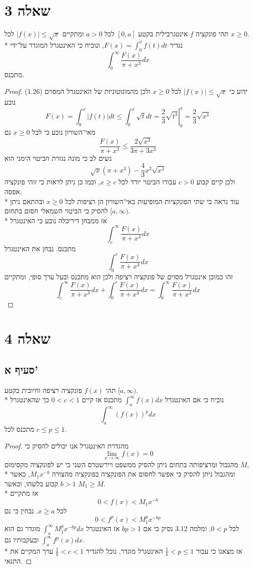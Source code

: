 \section{שאלה 3}
תהי פונקציה $f$ אינטגרבילית בקטע $[0, a]$ לכל $a > 0$ ומתקיים $\lvert f(x) \rvert \le \sqrt{x}$ לכל $x \ge 0$. \\*
נגדיר $F(x) = \int_0^x f(t) dt$, ונוכיח כי האינטגרל המוגדר על־ידי
\[
	\int_0^\infty \frac{F(x)}{\pi + x^3} dx \tag{1}
\]
מתכנס.
\begin{proof}
	ידוע כי $\lvert f(x) \rvert \le \sqrt{x}$ לכל $x \ge 0$ ולכן מהמונוטוניות של האינטגרל המסוים (1.26) נובע
	\[
		F(x) = \int_0^x \lvert f(t) \rvert dt \le \int_0^x \sqrt{t} dt = \left. \frac{2}{3} \sqrt{t^3} \right|_0^x = \frac{2}{3} \sqrt{x^3}
	\]
	מאי־השוויון נובע כי לכל $x \ge 0$ גם
	\[
		\frac{F(x)}{\pi + x^3} \le \frac{2 \sqrt{x^3}}{3 \pi + 3 x^3} \tag{2}
	\]
	נשים לב כי מונה נגזרת הביטוי הימני הוא
	\[
		\sqrt{x} (\pi + x^3) - \frac{4}{3} x^2 \sqrt{x^3}
	\]
	ולכן קיים קבוע $c > 0$ עבורו הביטוי יורד לכל $x \ge c$, וכמו כן ניתן לראות כי זוהי פונקציה אפסה. \\*
	עוד נראה כי שתי הפונקציות המופיעות באי־השוויון הן רציפות לכל $x \ge 0$ ובהתאם ניתן להסיק כי הביטוי השמאלי חסום בתחום $[a, \infty)$. \\* %
	אז ממבחן דיריכלה נובע כי האינטגרל
	\[
		\int_c^\infty \frac{F(x)}{\pi + x^3} dx
	\]
	מתכנס. נבחן את האינטגרל
	\[
		\int_0^c \frac{F(x)}{\pi + x^3} dx
	\]
	זהו כמובן אינטגרל מסוים של פונקציה רציפה ולכן הוא מתכנס ובעל ערך סופי, ומתקיים
	\[
		\int_c^\infty \frac{F(x)}{\pi + x^3} dx + \int_0^c \frac{F(x)}{\pi + x^3} dx
		= \int_0^\infty \frac{F(x)}{\pi + x^3} dx
	\]
\end{proof}

\section{שאלה 4}
\subsection{סעיף א'}
תהי $f(x)$ פונקציה רציפה וחיובית בקטע $[a, \infty)$. \\* %
נוכיח כי אם האינטגרל $\int_a^\infty f(x) dx$ מתכנס אז קיים $0 < c < 1$ כך שהאינטגרל
\[
	\int_a^\infty {(f(x))}^p dx
\]
מתכנס לכל $c \le p \le 1$.
\begin{proof}
	מהגדרת האינטגרל אנו יכולים להסיק כי
	\[
		\lim_{x \to \infty} f(x) = 0
	\]
	מהגבול ומרציפותה בתחום ניתן להסיק ממשפט ויירשטרס השני כי יש לפונקציה מקסימום $M$, \\*
	ומהגבול ניתן להסיק כי אפשר לחסום את הפונקציה בפונקציה מהצורה $M_1 x^{-b}$, כאשר $b > 1$ קבוע כלשהו, וכאשר $M_1 \ge M$. \\*
	אז מתקיים
	\[
		0 < f(x) < M_1 x^{-b}
	\]
	לכל $x \ge a$. נבחין כי גם
	\[
		0 < f^p(x) < M_1^p x^{-bp}
	\]
	לכל $0 < p$, ומלמה 3.12 נסיק כי אם $bp > 1$ אז האינטגרל $\int_a^\infty M_1^p x^{-bp}dx$ מוגדר גם הוא ובעקבותיו גם $\int_a^\infty f^p(x) dx$. \\*
	אז מצאנו כי עבור $\frac{1}{b} < p \le 1$ האינטגרל מוגדר, נוכל להגדיר $\frac{1}{b} < c < 1$ ערך המקיים את התנאי.
\end{proof}

